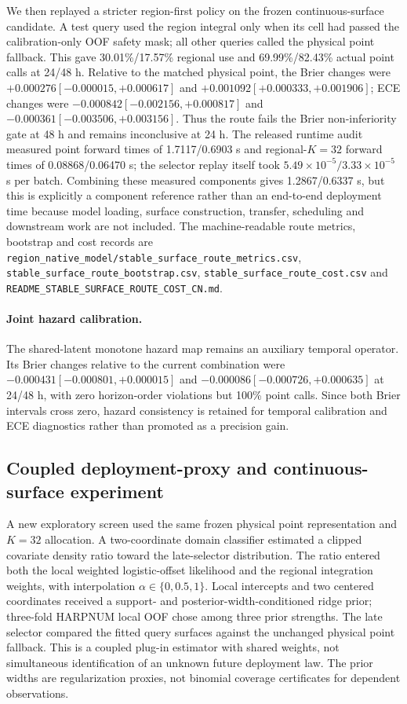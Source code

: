 \documentclass[11pt,a4paper]{article}
\numberwithin{equation}{section}
\theoremstyle{definition}\newtheorem{definition}[theorem]{Definition}
\theoremstyle{remark}\newtheorem{remark}[theorem]{Remark}
\begin{document}
We then replayed a stricter region-first policy on the frozen continuous-surface candidate. A test query used the region integral only when its cell had passed the calibration-only OOF safety mask; all other queries called the physical point fallback. This gave 30.01\%/17.57\% regional use and 69.99\%/82.43\% actual point calls at 24/48 h. Relative to the matched physical point, the Brier changes were $+0.000276[-0.000015,+0.000617]$ and $+0.001092[+0.000333,+0.001906]$; ECE changes were $-0.000842[-0.002156,+0.000817]$ and $-0.000361[-0.003506,+0.003156]$. Thus the route fails the Brier non-inferiority gate at 48 h and remains inconclusive at 24 h. The released runtime audit measured point forward times of 1.7117/0.6903 s and regional-$K=32$ forward times of 0.08868/0.06470 s; the selector replay itself took $5.49\times10^{-5}/3.33\times10^{-5}$ s per batch. Combining these measured components gives 1.2867/0.6337 s, but this is explicitly a component reference rather than an end-to-end deployment time because model loading, surface construction, transfer, scheduling and downstream work are not included. The machine-readable route metrics, bootstrap and cost records are \texttt{region\_native\_model/stable\_surface\_route\_metrics.csv}, \texttt{stable\_surface\_route\_bootstrap.csv}, \texttt{stable\_surface\_route\_cost.csv} and \texttt{README\_STABLE\_SURFACE\_ROUTE\_COST\_CN.md}.

\paragraph{Joint hazard calibration.}
The shared-latent monotone hazard map remains an auxiliary temporal operator. Its Brier changes relative to the current combination were $-0.000431[-0.000801,+0.000015]$ and $-0.000086[-0.000726,+0.000635]$ at 24/48 h, with zero horizon-order violations but 100\% point calls. Since both Brier intervals cross zero, hazard consistency is retained for temporal calibration and ECE diagnostics rather than promoted as a precision gain.

\subsection{Coupled deployment-proxy and continuous-surface experiment}
A new exploratory screen used the same frozen physical point representation and $K=32$ allocation. A two-coordinate domain classifier estimated a clipped covariate density ratio toward the late-selector distribution. The ratio entered both the local weighted logistic-offset likelihood and the regional integration weights, with interpolation $\alpha\in\{0,0.5,1\}$. Local intercepts and two centered coordinates received a support- and posterior-width-conditioned ridge prior; three-fold HARPNUM local OOF chose among three prior strengths. The late selector compared the fitted query surfaces against the unchanged physical point fallback. This is a coupled plug-in estimator with shared weights, not simultaneous identification of an unknown future deployment law. The prior widths are regularization proxies, not binomial coverage certificates for dependent observations.
\end{document}
